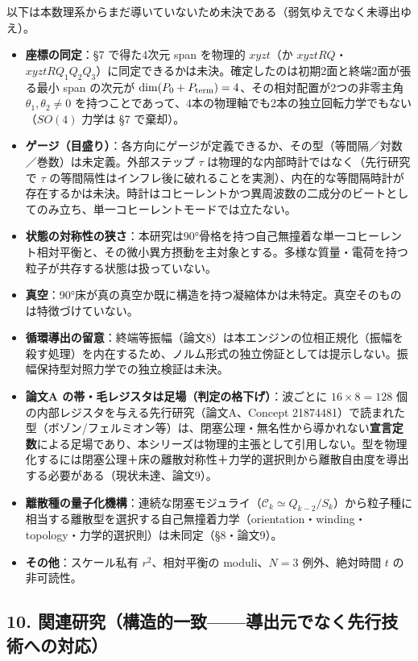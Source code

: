 \documentclass[
  a4paper,
]{ltjsarticle}
\providecommand{\tightlist}{%
  \setlength{\itemsep}{0pt}\setlength{\parskip}{0pt}}
\begin{document}
以下は本数理系からまだ導いていないため未決である（弱気ゆえでなく未導出ゆえ）。

\begin{itemize}
\tightlist
\item
  \textbf{座標の同定}：§7 で得た4次元 span を物理的 \(xyzt\)（か
  \(xyztRQ\)・\(xyztRQ_1Q_2Q_3\)）に同定できるかは未決。確定したのは初期2面と終端2面が張る最小
  span の次元が
  \(\dim(P_0+P_{\rm term})=4\)、その相対配置が2つの非零主角
  \(\theta_1,\theta_2\neq0\)
  を持つことであって、4本の物理軸でも2本の独立回転力学でもない（\(SO(4)\)
  力学は §7 で棄却）。
\item
  \textbf{ゲージ（目盛り）}：各方向にゲージが定義できるか、その型（等間隔／対数／巻数）は未定義。外部ステップ
  \(\tau\) は物理的な内部時計ではなく（先行研究で \(\tau\)
  の等間隔性はインフレ後に破れることを実測）、内在的な等間隔時計が存在するかは未決。時計はコヒーレントかつ異周波数の二成分のビートとしてのみ立ち、単一コヒーレントモードでは立たない。
\item
  \textbf{状態の対称性の狭さ}：本研究は90°骨格を持つ自己無撞着な単一コヒーレント相対平衡と、その微小異方摂動を主対象とする。多様な質量・電荷を持つ粒子が共存する状態は扱っていない。
\item
  \textbf{真空}：90°床が真の真空か既に構造を持つ凝縮体かは未特定。真空そのものは特徴づけていない。
\item
  \textbf{循環導出の留意}：終端等振幅（論文8）は本エンジンの位相正規化（振幅を殺す処理）を内在するため、ノルム形式の独立傍証としては提示しない。振幅保持型対照力学での独立検証は未決。
\item
  \textbf{論文A の帯・毛レジスタは足場（判定の格下げ）}：波ごとに
  \(16\times8=128\) 個の内部レジスタを与える先行研究（論文A、Concept
  21874481）で読まれた型（ボゾン/フェルミオン等）は、閉塞公理・無名性から導かれない\textbf{宣言定数}による足場であり、本シリーズは物理的主張として引用しない。型を物理化するには閉塞公理＋床の離散対称性＋力学的選択則から離散自由度を導出する必要がある（現状未達、論文9）。
\item
  \textbf{離散種の量子化機構}：連続な閉塞モジュライ（\(\mathcal C_k\simeq Q_{k-2}/S_k\)）から粒子種に相当する離散型を選択する自己無撞着力学（orientation・winding・topology・力学的選択則）は未同定（§8・論文9）。
\item
  \textbf{その他}：スケール私有 \(r^2\)、相対平衡の moduli、\(N=3\)
  例外、絶対時間 \(t\) の非可読性。
\end{itemize}

\subsection{10.
関連研究（構造的一致------導出元でなく先行技術への対応）}\label{ux95a2ux9023ux7814ux7a76ux69cbux9020ux7684ux4e00ux81f4ux5c0eux51faux5143ux3067ux306aux304fux5148ux884cux6280ux8853ux3078ux306eux5bfeux5fdc}
\end{document}
